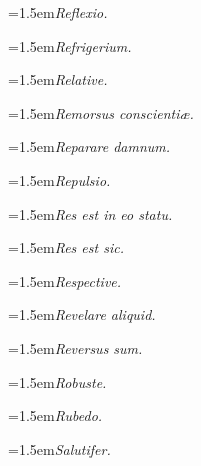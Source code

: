 \par{\dictfontsize\hangindent=1.5em\noindent \textit{Reflexio.} \par}
\par{\dictfontsize\hangindent=1.5em\noindent \textit{Refrigerium.} \par}
\par{\dictfontsize\hangindent=1.5em\noindent \textit{Relative.} \par}
\par{\dictfontsize\hangindent=1.5em\noindent \textit{Remorsus conscientiæ.} \par}
\par{\dictfontsize\hangindent=1.5em\noindent \textit{Reparare damnum.} \par}
\par{\dictfontsize\hangindent=1.5em\noindent \textit{Repulsio.} \par}
\par{\dictfontsize\hangindent=1.5em\noindent \textit{Res est in eo statu.} \par}
\par{\dictfontsize\hangindent=1.5em\noindent \textit{Res est sic.} \par}
\par{\dictfontsize\hangindent=1.5em\noindent \textit{Respective.} \par}
\par{\dictfontsize\hangindent=1.5em\noindent \textit{Revelare aliquid.} \par}
\par{\dictfontsize\hangindent=1.5em\noindent \textit{Reversus sum.} \par}
\par{\dictfontsize\hangindent=1.5em\noindent \textit{Robuste.} \par}
\par{\dictfontsize\hangindent=1.5em\noindent \textit{Rubedo.} \par}
\par{\dictfontsize\hangindent=1.5em\noindent \textit{Salutifer.} \par}
